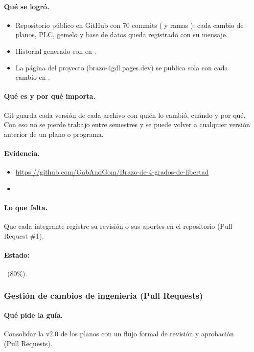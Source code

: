 \documentclass[a4paper,11pt]{article}
\begin{document}
\paragraph{Qué se logró.}
\begin{itemize}
\item Repositorio público en GitHub con 70 commits ( y ramas ); cada cambio de planos, PLC, gemelo y base de datos queda registrado con su mensaje.
\item Historial generado con  en .
\item La página del proyecto (brazo-4gdl.pages.dev) se publica sola con cada cambio en .
\end{itemize}
\paragraph{Qué es y por qué importa.} Git guarda cada versión de cada archivo con quién lo cambió, cuándo y por qué. Con eso no se pierde trabajo entre semestres y se puede volver a cualquier versión anterior de un plano o programa.
\paragraph{Evidencia.}
\begin{itemize}\small
\item \url{https://github.com/GabAndGom/Brazo-de-4-grados-de-libertad}
\item {}
\end{itemize}
\paragraph{Lo que falta.} Que cada integrante registre su revisión o sus aportes en el repositorio (Pull Request \#1).
\paragraph{Estado:} \parcial~(80\%).
\subsubsection{Gestión de cambios de ingeniería (Pull Requests)}
\paragraph{Qué pide la guía.} Consolidar la v2.0 de los planos con un flujo formal de revisión y aprobación (Pull Requests).
\end{document}
